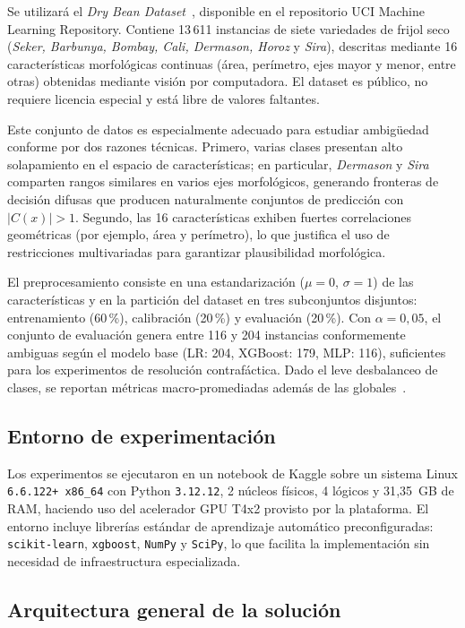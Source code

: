 \documentclass[conference]{IEEEtran}
\begin{document}
Se utilizará el \textit{Dry Bean Dataset}~\cite{b5}, disponible en el
repositorio UCI Machine Learning Repository. Contiene 13\,611 instancias
de siete variedades de frijol seco (\textit{Seker, Barbunya, Bombay, Cali,
Dermason, Horoz} y \textit{Sira}), descritas mediante 16 características
morfológicas continuas (área, perímetro, ejes mayor y menor, entre otras)
obtenidas mediante visión por computadora. El dataset es público, no
requiere licencia especial y está libre de valores faltantes.

Este conjunto de datos es especialmente adecuado para estudiar ambigüedad
conforme por dos razones técnicas. Primero, varias clases presentan alto
solapamiento en el espacio de características; en particular,
\textit{Dermason} y \textit{Sira} comparten rangos similares en varios
ejes morfológicos, generando fronteras de decisión difusas que producen
naturalmente conjuntos de predicción con $|C(x)|>1$. Segundo, las 16
características exhiben fuertes correlaciones geométricas (por ejemplo,
área y perímetro), lo que justifica el uso de restricciones multivariadas
para garantizar plausibilidad morfológica.

El preprocesamiento consiste en una estandarización ($\mu = 0$, $\sigma = 1$)
de las características y en la partición del dataset en tres subconjuntos
disjuntos: entrenamiento (60\,\%), calibración (20\,\%) y evaluación
(20\,\%). Con $\alpha = 0{,}05$, el conjunto de evaluación genera entre
116 y 204 instancias conformemente ambiguas según el modelo base
(LR: 204, XGBoost: 179, MLP: 116), suficientes para los experimentos
de resolución contrafáctica. Dado el leve desbalanceo de clases, se
reportan métricas macro-promediadas además de las globales~\cite{b5}.

\subsection{Entorno de experimentación}

Los experimentos se ejecutaron en un notebook de Kaggle sobre un sistema
Linux \texttt{6.6.122+ x86\_64} con Python \texttt{3.12.12}, 2 núcleos
físicos, 4 lógicos y 31{,}35~GB de RAM, haciendo uso del acelerador GPU
T4x2 provisto por la plataforma. El entorno incluye librerías estándar
de aprendizaje automático preconfiguradas: \texttt{scikit-learn},
\texttt{xgboost}, \texttt{NumPy} y \texttt{SciPy}, lo que facilita la
implementación sin necesidad de infraestructura especializada.

\subsection{Arquitectura general de la solución}
\end{document}
